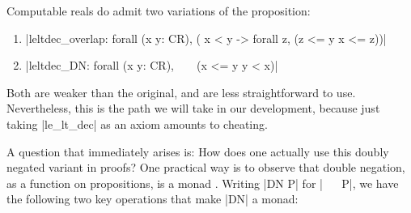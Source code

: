 \documentclass[runningheads]{llncs}
\newcommand{\Exists}[2]{\exists_{#1} \, . \, #2}
\newcommand{\weg}[1]{}
\newcommand{\IR}{{\mathbf R}}
\newcommand{\Inv}{{\rm Inv}}
\newcommand{\contrans}{\rightarrow_C}
\newcommand{\Dur}{{\IR_{\geq 0}}}
\begin{document}
Computable reals do admit two variations of the proposition:
\begin{enumerate}
\item |leltdec_overlap: forall (x y: CR), ( x < y -> forall z, (z <= y \/ x <= z))|
\item |leltdec_DN: forall (x y: CR), ~ ~ (x <= y \/ y < x)|
\end{enumerate}

Both are weaker than the original, and are less straightforward to
use. Nevertheless, this is the path we will take in our development,
because just taking |le_lt_dec| as an axiom amounts to cheating.
\weg{ 
A place where we definitely need the stability of the invariant is in
proving the obvious and useful property of {\em transitivity of the
  continuous transition relation}: Suppose we have $(l, p) \contrans
(l, p')$ and $(l, p')\contrans (l, p'')$ for location $l$ and points
$p, p', p''$. 
To show $(l, p)\contrans (l, p'')$, we must show (among other things)
that the invariant holds at each point along the way. That is,
$$\forall t, 0 \leq t \leq d + d' \rightarrow \Inv_l( \Phi_L(p, t)).$$
We know this is true for $0 \leq t \leq d$, and we know that this is
true for $d \leq t \leq d + d'$. Classically, then, the proof is done,
for one can simply distinguish cases $t \leq d$ or $d < t$.  In our
transitivity proof, we will use the variant expressed using double
negation. Now we need only observe that $x \leq y$ is equivalent to $\neg(y < x)$, and that the law of the excluded middle holds under double negation. That is,
$\forall P( \neg  \neg  (P \vee \neg  P))$
is a trivial tautology.
}
A question that immediately arises is: How does one actually use this
doubly negated variant in proofs?  One practical way is to observe
that double negation, as a function on propositions, is a monad
\cite{wadler95monads}. Writing |DN P| for |~ ~ P|, we have the following two key
operations that make |DN| a monad:
\end{document}
